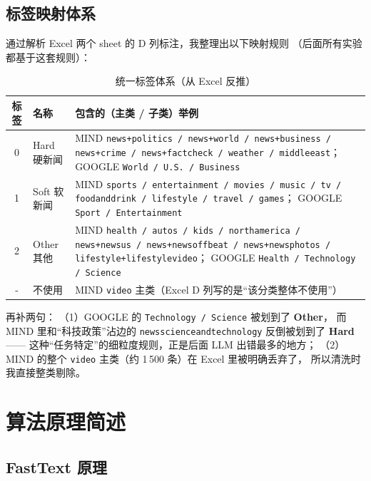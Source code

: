 \documentclass{SYSUReport}
\begin{document}
\subsection{标签映射体系}\label{sec:label-map}

通过解析 Excel 两个 sheet 的 D 列标注，我整理出以下映射规则
（后面所有实验都基于这套规则）：

\begin{table}[!htbp]
\centering
\caption{统一标签体系（从 Excel 反推）}
\label{tab:label-system}
\begin{tabular}{clp{8.5cm}}
\toprule
标签 & 名称 & 包含的（主类 / 子类）举例 \\
\midrule
0 & Hard 硬新闻
  & MIND \texttt{news+politics / news+world / news+business / news+crime / news+factcheck / weather / middleeast}；
    GOOGLE \texttt{World / U.S. / Business} \\
\midrule
1 & Soft 软新闻
  & MIND \texttt{sports / entertainment / movies / music / tv / foodanddrink / lifestyle / travel / games}；
    GOOGLE \texttt{Sport / Entertainment} \\
\midrule
2 & Other 其他
  & MIND \texttt{health / autos / kids / northamerica / news+newsus / news+newsoffbeat / news+newsphotos / lifestyle+lifestylevideo}；
    GOOGLE \texttt{Health / Technology / Science} \\
\midrule
- & 不使用 & MIND \texttt{video} 主类（Excel D 列写的是“该分类整体不使用”）\\
\bottomrule
\end{tabular}
\end{table}

再补两句：
（1）GOOGLE 的 \texttt{Technology / Science} 被划到了 \textbf{Other}，
而 MIND 里和“科技政策”沾边的 \texttt{newsscienceandtechnology} 反倒被划到了 \textbf{Hard}——
这种“任务特定”的细粒度规则，正是后面 LLM 出错最多的地方；
（2）MIND 的整个 \texttt{video} 主类（约 1\,500 条）在 Excel 里被明确丢弃了，
所以清洗时我直接整类剔除。


\section{算法原理简述}

\subsection{FastText 原理}
\end{document}
